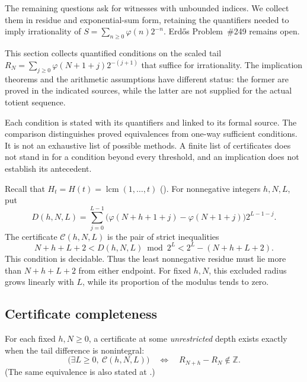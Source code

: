 The remaining questions ask for witnesses with unbounded indices.
We collect them in residue and exponential-sum form, retaining the
quantifiers needed to imply irrationality of
$S=\sum_{n\ge0}\varphi(n)2^{-n}$. Erd\H{o}s Problem~\#249 remains open.

This section collects quantified conditions on the scaled tail
$R_N=\sum_{j\ge0}\varphi(N+1+j)2^{-(j+1)}$ that suffice for irrationality.
The implication theorems and the arithmetic assumptions have different
status: the former are proved in the indicated sources, while the latter
are not supplied for the actual totient sequence.


Each condition is stated with its quantifiers and linked to its formal
source. The comparison distinguishes proved equivalences from one-way
sufficient conditions. It is not an exhaustive list of possible methods.
A finite list of certificates does not stand in for a condition beyond
every threshold, and an implication does not establish its antecedent.


Recall that $H_t=H(t)=\operatorname{lcm}(1,\dots,t)$
().
For nonnegative integers $h,N,L$, put
\[
D(h,N,L)=\sum_{j=0}^{L-1}
 \bigl(\varphi(N+h+1+j)-\varphi(N+1+j)\bigr)2^{L-1-j}.
\]
The certificate $\mathcal C(h,N,L)$ is the pair of strict inequalities
\[
 N+h+L+2<D(h,N,L)\bmod2^L<2^L-(N+h+L+2).
\]
This condition is decidable.
Thus the least nonnegative residue must lie more than $N+h+L+2$
from either endpoint. For fixed $h,N$, this excluded radius grows
linearly with $L$, while its proportion of the modulus tends to zero.

\subsection{Certificate completeness}

For each fixed $h,N\ge0$, a certificate at some \emph{unrestricted}
depth exists exactly when the tail difference is nonintegral:
\[
 \bigl(\exists L\ge0,\ \mathcal C(h,N,L)\bigr)
 \quad\Longleftrightarrow\quad R_{N+h}-R_N\notin\mathbb Z.
\]
(The same equivalence is also stated at
.)

